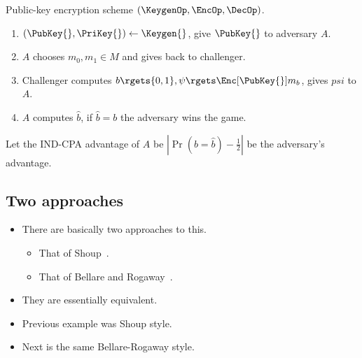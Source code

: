 \begin{frame}
  \begin{example}
    Public-key encryption scheme \((\KeygenOp, \EncOp, \DecOp)\).
    \begin{enumerate}
        
        \pause{}

      \item \((\PubKey{}, \PriKey{})\gets \Keygen{}\), give \(\PubKey{}\) to 
        adversary \(A\).

        \pause{}

      \item \(A\) chooses \(m_0, m_1\in M\) and gives back to challenger.

        \pause{}

      \item Challenger computes \(b\rgets \{0, 1\}, \psi\rgets \Enc[\PubKey{}]{ 
            m_b }\), gives \(psi\) to \(A\).

        \pause{}

      \item \(A\) computes \(\hat{b}\), if \(\hat{b} = b\) the adversary wins 
        the game.

    \end{enumerate}

    \pause{}

    Let the IND-CPA advantage of \(A\) be \(|\Pr( b = \hat{b} 
      ) - \frac{1}{2}|\) be the adversary's advantage.
  \end{example}
\end{frame}

\subsection{Two approaches}

\begin{frame}
  \begin{itemize}
      \item There are basically two approaches to this.
        \begin{itemize}
          \item That of Shoup~\cite{Shoup2004Sequences}.
          \item That of Bellare and Rogaway~\cite{Bellare2004CodeBased}.
        \end{itemize}

        \pause{}

      \item They are essentially equivalent.

        \pause{}

      \item Previous example was Shoup style.

      \item Next is the same Bellare-Rogaway style.
  \end{itemize}
\end{frame}

